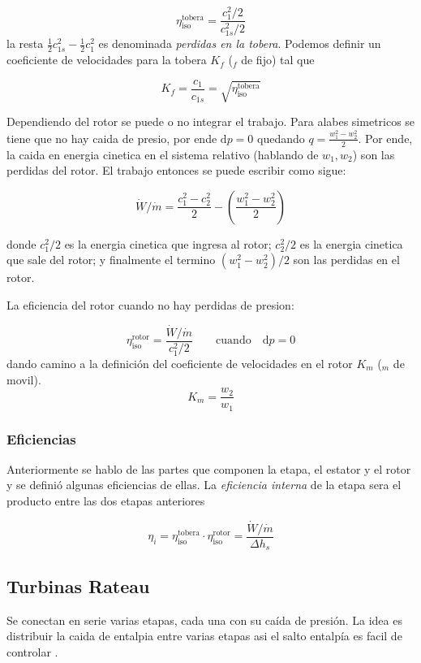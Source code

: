\documentclass{article}
\newcommand{\di}{\textrm{d}}
\newcommand{\etaiso}{\eta_{\mathrm{iso}}}
\newcommand{\dW}{\dot{W}}
\newcommand{\dm}{\dot{m}}
\begin{document}
\begin{equation}
    \etaiso^{\mathrm{tobera}}=\frac{c_{1}^2/2}{c_{1s}^2/2}
\end{equation}
la resta $\frac{1}{2}c^2_{1s} -\frac{1}{2}c^2_{1}$ es denominada \textit{perdidas en la tobera}. Podemos definir un coeficiente de velocidades para la tobera $K_f$ ($_f$ de fijo) tal que 

\[
K_f = \frac{c_1}{c_{1s}} = \sqrt{\etaiso^{\mathrm{tobera}}}
\]

Dependiendo del rotor se puede o no integrar el trabajo. Para alabes simetricos se tiene que no hay caida de presio, por ende $\di p=0$ quedando $q=\frac{w_1^2 - w_2^2}{2}$. Por ende, la caida en energia cinetica en el sistema relativo (hablando de $w_1,w_2$) son las perdidas del rotor. El trabajo entonces se puede escribir como sigue:

\begin{equation*}
    \dW/\dm = \frac{c_1^2-c_2^2}{2} - \left( \frac{w_1^2-w_2^2}{2} \right)
\end{equation*}

donde $c_1^2/2$ es la energia cinetica que ingresa al rotor; $c_2^2/2$ es la energia cinetica que sale del rotor; y finalmente el termino $(w_1^2-w_2^2)/2$ son las perdidas en el rotor.

La eficiencia del rotor cuando no hay perdidas de presion:

\begin{equation}
    \etaiso^{\mathrm{rotor}} = \frac{\dW/\dm }{c_1^2/2} \qquad \mathrm{cuando} \quad \di p = 0
\end{equation}
dando camino a la definición del coeficiente de velocidades en el rotor $K_m$ ($_m$ de movil).
\[
K_m = \frac{w_2}{w_1}
\]



\subsubsection{Eficiencias}
Anteriormente se hablo de las partes que componen la etapa, el estator y el rotor y se definió algunas eficiencias de ellas. La \textit{eficiencia interna} de la etapa sera el producto entre las dos etapas anteriores

\[
\eta_i = \etaiso^{\mathrm{tobera}}\cdot \etaiso^{\mathrm{rotor}} = \frac{\dW/\dm}{\Delta h_s}
\]

\subsection{Turbinas Rateau}
Se conectan en serie varias etapas, cada una con su caída de presión. La idea es distribuir la caida de entalpia entre varias etapas asi el salto entalpía es facil de controlar \citep{book:TurboDick}. 
\end{document}
